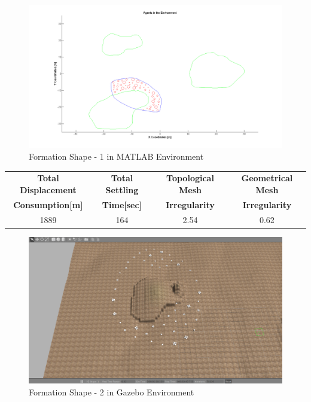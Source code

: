 \begin{figure}[H]
\caption{Formation Shape - 1 in MATLAB Environment}
\centerline{\includegraphics[scale = 0.40]{1}}
\end{figure} 
			
\begin{center}
 \label{perf_shape1} 
\begin{tabular}{||c| c |c |c ||}
					
\hline
\textbf{Total Displacement }  & \textbf{Total Settling} & \textbf{Topological Mesh} & \textbf{Geometrical Mesh} \\ \textbf{Consumption[m]} & \textbf{Time[sec]}& \textbf{Irregularity} & \textbf{Irregularity} \\
\hline
1889 & 164 &  2.54& 0.62\\
\hline
\end{tabular}
\end{center}
	
\begin{figure}[H]
\caption{Formation Shape - 2 in Gazebo Environment}
\centerline{\includegraphics[scale = 0.35]{2_Gazebo}}
\end{figure} 
		 
